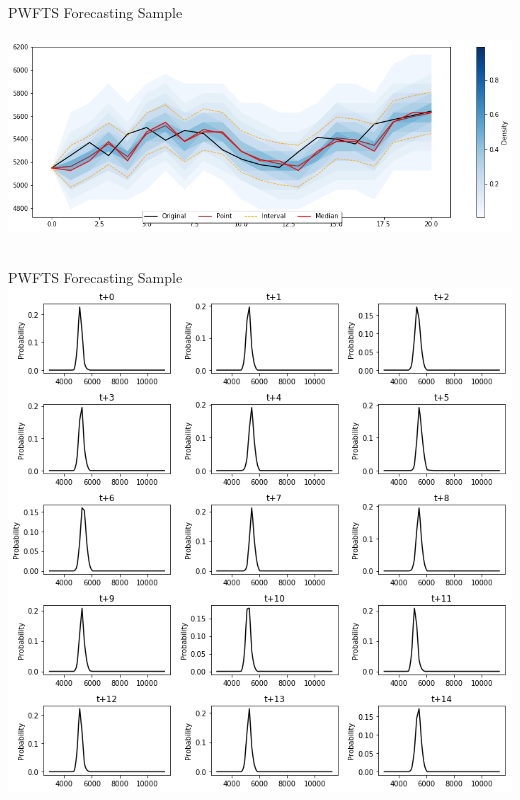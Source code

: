 \documentclass{beamer}
\begin{document}

\begin{frame}{PWFTS Forecasting Sample}
\includegraphics[width=\textwidth,height=6cm]{figures/pwfts_sample_onestep.png}
\end{frame}

\begin{frame}{PWFTS Forecasting Sample}
\includegraphics[width=\textwidth]{figures/pwfts_sample_onestep_tiled.png}
\end{frame}
\end{document}

